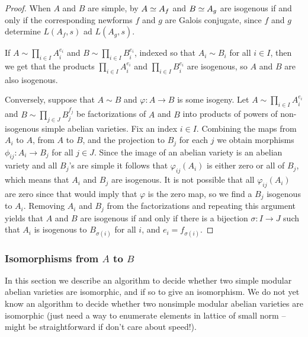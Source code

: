 \documentclass{article}
\begin{document}
\begin{proof}
  When $A$ and $B$ are simple, by \cite[\S5]{faltings:finiteness}
  $A\simeq A_f$ and $B\simeq A_g$ are isogenous if and only if the
  corresponding newforms $f$ and $g$ are Galois conjugate,
since $f$ and $g$ determine $L(A_f,s)$ ad $L(A_g,s)$.

If $A \sim \prod_{i \in I} A_i^{e_i}$ and $B \sim \prod_{i \in I}
B_i^{e_i}$, indexed so that $A_i \sim B_i$ for all $i \in I$, then we
get that the products $\prod_{i \in I} A_i^{e_i}$ and $\prod_{i \in I}
B_i^{e_i}$ are isogenous, so $A$ and $B$ are also isogenous.

  Conversely, suppose that $A \sim B$ and $\varphi: A \to B$ is some
  isogeny.  Let $A \sim \prod_{i \in I} A_i^{e_i}$ and $B \sim
  \prod_{j \in J} B_j^{f_j}$ be factorizations of $A$ and $B$ into
  products of powers of non-isogenous simple abelian varieties. Fix an
  index $i \in I$.  Combining the maps from $A_i$ to $A$, from $A$ to
  $B$, and the projection to $B_j$ for each $j$ we obtain morphisms
  $\phi_{ij}: A_i \to B_j$ for all $j \in J$. Since the image of an
  abelian variety is an abelian variety and all $B_j$'s are simple it
  follows that $\varphi_{ij}(A_i)$ is either zero or all of $B_j$,
  which means that $A_i$ and $B_j$ are isogenous. It is not possible
  that all $\varphi_{ij}(A_i)$ are zero since that would imply that
  $\varphi$ is the zero map, so we find a $B_j$ isogenous to
  $A_i$. Removing $A_i$ and $B_j$ from the factorizations and
  repeating this argument yields that $A$ and $B$ are isogenous if and
  only if there is a bijection $\sigma:I\to J$ such that $A_i$ is
  isogenous to $B_{\sigma(i)}$ for all $i$, and $e_i = f_{\sigma(i)}$.
\end{proof}

\subsubsection{Isomorphisms from $A$ to $B$}

In this section we describe an algorithm to decide whether two simple
modular abelian varieties are isomorphic, and if so to give an
isomorphism.  We do not yet know an algorithm to decide whether two
nonsimple modular abelian varieties are isomorphic (just need a way
to enumerate elements in lattice of small norm -- might be straightforward
if don't care about speed!).
\end{document}
